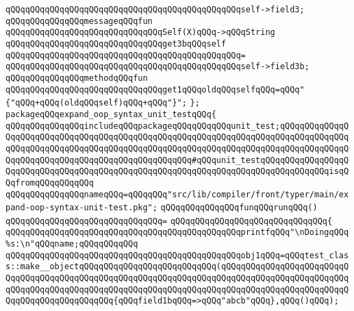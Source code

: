 \verb|qQQqqQQqqQQqqQQqqQQqqQQqqQQqqQQqqQQqqQQqqQQqqQQqself->field3;|\newline
\newline
\verb|qQQqqQQqqQQqqQQqmessageqQQqfun|\newline
\verb|qQQqqQQqqQQqqQQqqQQqqQQqqQQqqQQqSelf(X)qQQq->qQQqString|\newline
\verb|qQQqqQQqqQQqqQQqqQQqqQQqqQQqqQQqget3bqQQqself|\newline
\verb|qQQqqQQqqQQqqQQqqQQqqQQqqQQqqQQqqQQqqQQqqQQqqQQq=|\newline
\verb|qQQqqQQqqQQqqQQqqQQqqQQqqQQqqQQqqQQqqQQqqQQqqQQqself->field3b;|\newline
\newline
\verb|qQQqqQQqqQQqqQQqmethodqQQqfun|\newline
\verb|qQQqqQQqqQQqqQQqqQQqqQQqqQQqqQQqget1qQQqoldqQQqselfqQQq=qQQq"{"qQQq+qQQq(oldqQQqself)qQQq+qQQq"}";|\newline
\verb|};|\newline
\newline
\verb|packageqQQqexpand_oop_syntax_unit_testqQQq{|\newline
\newline
\verb|qQQqqQQqqQQqqQQqincludeqQQqpackageqQQqqQQqqQQqunit_test;qQQqqQQqqQQqqQQqqQQqqQQqqQQqqQQqqQQqqQQqqQQqqQQqqQQqqQQqqQQqqQQqqQQqqQQqqQQqqQQqqQQqqQQqqQQqqQQqqQQqqQQqqQQqqQQqqQQqqQQqqQQqqQQqqQQqqQQqqQQqqQQqqQQqqQQqqQQqqQQqqQQqqQQqqQQqqQQqqQQqqQQqqQQqqQQq#qQQqunit_testqQQqqQQqqQQqqQQqqQQqqQQqqQQqqQQqqQQqqQQqqQQqqQQqqQQqqQQqqQQqqQQqqQQqqQQqqQQqqQQqqQQqisqQQqfromqQQqqQQqqQQq|\newline
\newline
\verb|qQQqqQQqqQQqqQQqnameqQQq=qQQqqQQq"src/lib/compiler/front/typer/main/expand-oop-syntax-unit-test.pkg";|\newline
\newline
\verb|qQQqqQQqqQQqqQQqfunqQQqrunqQQq()|\newline
\verb|qQQqqQQqqQQqqQQqqQQqqQQqqQQqqQQq=|\newline
\verb|qQQqqQQqqQQqqQQqqQQqqQQqqQQqqQQq{|\newline
\verb|qQQqqQQqqQQqqQQqqQQqqQQqqQQqqQQqqQQqqQQqqQQqqQQqprintfqQQq"\nDoingqQQq%s:\n"qQQqname;qQQqqQQqqQQq|\newline
\newline
\verb|qQQqqQQqqQQqqQQqqQQqqQQqqQQqqQQqqQQqqQQqqQQqqQQqobj1qQQq=qQQqtest_class::make__objectqQQqqQQqqQQqqQQqqQQqqQQqqQQq(qQQqqQQqqQQqqQQqqQQqqQQqqQQqqQQqqQQqqQQqqQQqqQQqqQQqqQQqqQQqqQQqqQQqqQQqqQQqqQQqqQQqqQQqqQQqqQQqqQQqqQQqqQQqqQQqqQQqqQQqqQQqqQQqqQQqqQQqqQQqqQQqqQQqqQQqqQQqqQQqqQQqqQQqqQQqqQQqqQQqqQQqqQQq{qQQqfield1bqQQq=>qQQq"abcb"qQQq},qQQq()qQQq);|\newline
